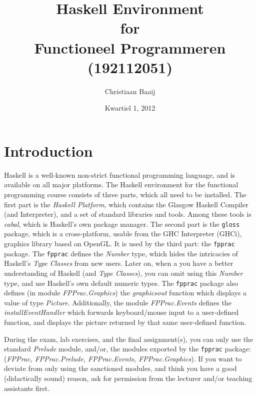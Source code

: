 \documentclass[]{article}
\title{Haskell Environment \\ for \\ Functioneel Programmeren (192112051)}
\author{Christiaan Baaij}
\date{Kwartiel 1, 2012}
\begin{document}

\maketitle

\section{Introduction}
Haskell is a well-known non-strict functional programming language, and is available on all major platforms.
%
The Haskell environment for the functional programming course consists of three parts, which all need to be installed.
The first part is the \emph{Haskell Platform}, which contains the Glasgow Haskell Compiler (and Interpreter), and a set of standard libraries and tools.
Among these tools is \emph{cabal}, which is Haskell's own package manager. The second part is the \texttt{gloss} package, which is a cross-platform, usable from the GHC Interpreter (GHCi), graphics library based on OpenGL.
It is used by the third part: the \texttt{fpprac} package. The \texttt{fpprac} defines the \emph{Number} type, which hides the intricacies of Haskell's \emph{Type Classes} from new users.
Later on, when a you have a better understanding of Haskell (and \emph{Type Classes}), you can omit using this \emph{Number} type, and use Haskell's own default numeric types.
The \texttt{fpprac} package also defines (in module \emph{FPPrac.Graphics}) the \emph{graphicsout} function which displays a value of type \emph{Picture}. Additionally, the module \emph{FPPrac.Events} defines the \emph{installEventHandler} which forwards keyboard/mouse input to a user-defined function, and displays the picture returned by that same user-defined function.

During the exam, lab exercises, and the final assignment(s), you can only use the standard \emph{Prelude} module, and/or, the modules exported by the \texttt{fpprac} package: (\emph{FPPrac, FPPrac.Prelude, FPPrac.Events, FPPrac.Graphics}).
If you want to deviate from only using the sanctioned modules, and think you have a good (didactically sound) reason, ask for permission from the lecturer and/or teaching assistants first.
\end{document}
